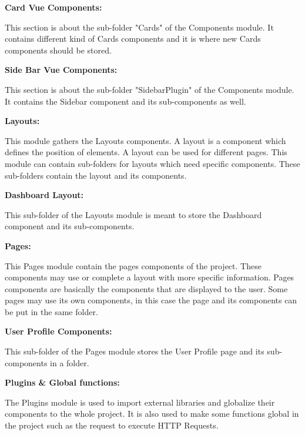 \documentclass[conference]{IEEEtran}
\begin{document}
\vspace{0.5cm}

\textbf{Card Vue Components:}

This section is about the sub-folder "Cards" of the Components module. It contains different kind of Cards components and it is where new Cards components should be stored.

\vspace{0.5cm}

\textbf{Side Bar Vue Components:}

This section is about the sub-folder "SidebarPlugin" of the Components module. It contains the Sidebar component and its sub-components as well.

\vspace{0.5cm}

\textbf{Layouts:}

This module gathers the Layouts components. A layout is a component which defines the position of elements. A layout can be used for different pages. This module can contain sub-folders for layouts which need specific components. These sub-folders contain the layout and its components.

\vspace{0.5cm}

\textbf{Dashboard Layout:}

This sub-folder of the Layouts module is meant to store the Dashboard component and its sub-components.

\vspace{0.5cm}

\textbf{Pages:}

This Pages module contain the pages components of the project. These components may use or complete a layout with more specific information. Pages components are basically the components that are displayed to the user. Some pages may use its own components, in this case the page and its components can be put in the same folder.

\vspace{0.5cm}

\textbf{User Profile Components:}

This sub-folder of the Pages module stores the User Profile page and its sub-components in a folder.

\vspace{0.5cm}

\textbf{Plugins \& Global functions:}  

The Plugins module is used to import external libraries and globalize their components to the whole project. It is also used to make some functions global in the project such as the request to execute HTTP Requests.
\end{document}
